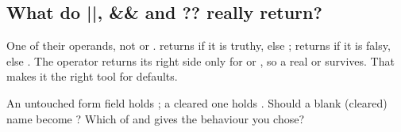 \subsection{What do ||, \&\& and ?? really return?}%
One of their operands, not  or .  returns  if it is truthy, else ;  returns  if it is falsy, else . The  operator  returns its right side only for  or , so a real  or  survives. That makes it the right tool for defaults.

\begin{ponder}An untouched form field holds ; a cleared one holds . Should a blank (cleared) name become ? Which of \code{||} and  gives the behaviour you chose?\end{ponder}
